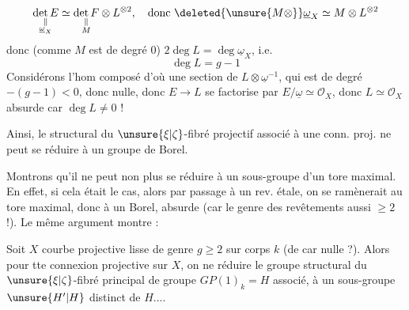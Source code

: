 \[
\underset{\substack{\Vert\\\underline{\omega}_X}}{\det E}
\simeq \underset{\substack{\Vert\\M}}{\det F}\otimes L^{\otimes2},
\quad\text{donc }\deleted{\unsure{M\otimes}}\underline{\omega}_X\simeq M\otimes L^{\otimes2}
\]
donc (comme $M$ est de degré $0$) $2\deg L=\deg\underline{\omega}_X$, i.e. 
\[
\deg L=g-1
\]
Considérons l'hom composé
d'où une section de $L\otimes\underline{\omega}^{-1}$, qui est de degré $-(g-1)<0$, donc  nulle, donc  $E\to L$ se factorise par $E/\underline{\omega}\simeq\mathcal O_X$, donc $L\simeq\mathcal O_X$ absurde car $\deg L\ne0$ !

Ainsi, le   structural du $\unsure{\xi|\zeta}$-fibré projectif associé à une conn. proj. ne peut se réduire à un groupe de Borel.

Montrons qu'il ne peut non plus se réduire à un sous-groupe  d'un tore maximal. En effet, si cela était le cas, alors par passage à un rev. étale, on se ramènerait au tore maximal, donc à un Borel, absurde (car le genre des revêtements  aussi $\geq2$ !). Le même argument montre :

\uline{} Soit $X$ courbe projective lisse  de genre $g\geq2$ sur corps $k$ (de car nulle ?). Alors pour tte connexion projective sur $X$, on ne  \deleted{$\unsure{\xi}$} réduire le groupe structural du $\unsure{\xi|\zeta}$-fibré principal de groupe $GP(1)_k=H$ associé, à un sous-groupe  $\unsure{H'|H}$ distinct de $H$....
\margin{!}

